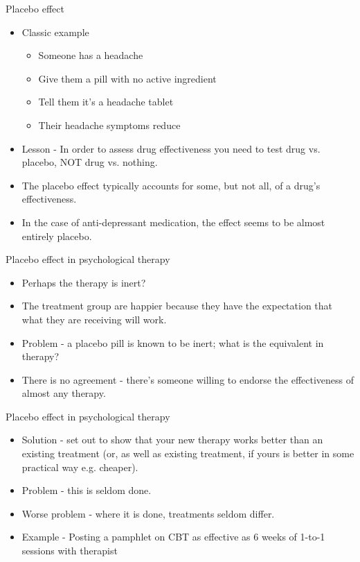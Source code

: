 \documentclass{beamer}
\begin{document}
\begin{frame}{Placebo effect}
\begin{itemize}
\item Classic example
\begin{itemize}
\item Someone  has a headache
\item Give them a pill with no active ingredient
\item Tell them it's a headache tablet
\item Their headache symptoms reduce
\end{itemize}
\item Lesson - In order to assess drug effectiveness you need to test drug vs. placebo, NOT drug vs. nothing.
\item The placebo effect typically accounts for some, but not all, of a drug's effectiveness.
\item In the case of anti-depressant medication, the effect seems to be almost entirely placebo.
\end{itemize}
\end{frame}

\begin{frame}{Placebo effect in psychological therapy}
\begin{itemize}
\item Perhaps the therapy is inert?
\item The treatment group are happier because they have the expectation that what they are receiving will work.
\item Problem - a placebo pill is known to be inert; what is the equivalent in therapy?
\item There is no agreement - there's someone willing to endorse the effectiveness of almost any therapy.
\end{itemize}
\end{frame}

\begin{frame}{Placebo effect in psychological therapy}
\begin{itemize}
\item Solution - set out to show that your new therapy works better than an existing treatment (or, as well as existing treatment, if yours is better in some practical way e.g. cheaper).
\item Problem - this is seldom done.
\item Worse problem - where it is done, treatments seldom differ. 
\item Example - Posting a pamphlet on CBT as effective as 6 weeks of 1-to-1 sessions with therapist
\end{itemize}
\end{frame}
\end{document}
